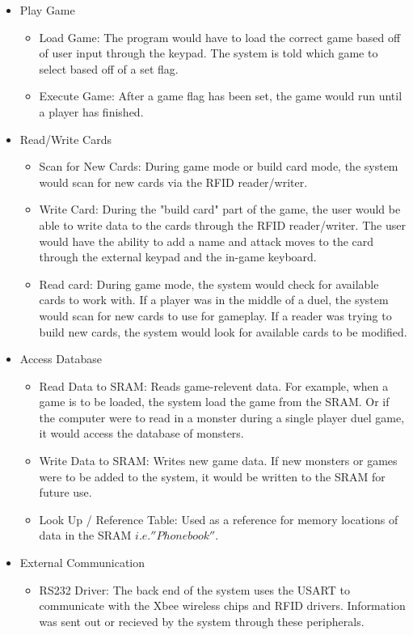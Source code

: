 \documentclass[12pt]{article} %
\begin{document}
\begin{itemize}
	\item Play Game
		\begin{itemize}
			\item Load Game: The program would have to load the correct game based off of user input through the keypad. The system is told which game to select based off of a set flag.
			\item Execute Game: After a game flag has been set, the game would run until a player has finished.
		\end{itemize}
	\item Read/Write Cards
		\begin{itemize}
			\item Scan for New Cards: During game mode or build card mode, the system would scan for new cards via the RFID reader/writer.
			\item Write Card: During the "build card" part of the game, the user would be able to write data to the cards through the RFID reader/writer. The user would have the ability to add a name and attack moves to the card through the external keypad and the in-game keyboard.
			\item Read card: During game mode, the system would check for available cards to work with. If a player was in the middle of a duel, the system would scan for new cards to use for gameplay. If a reader was trying to build new cards, the system would look for available cards to be modified.
		\end{itemize}
	\item Access Database
		\begin{itemize}
			\item Read Data to SRAM: Reads game-relevent data. For example, when a game is to be loaded, the system load the game from the SRAM. Or if the computer were to read in a monster during a single player duel game, it would access the database of monsters.
			\item Write Data to SRAM: Writes new game data. If new monsters or games were to be added to the system, it would be written to the SRAM for future use.
			\item Look Up / Reference Table: Used as a reference for memory locations of data in the SRAM \(i.e. ''Phone book''\).
		\end{itemize}
	\item External Communication
		\begin{itemize}
			\item RS232 Driver: The back end of the system uses the USART to communicate with the Xbee wireless chips and RFID drivers. Information was sent out or recieved by the system through these peripherals.

\end{itemize}
\end{itemize}
\end{document}
